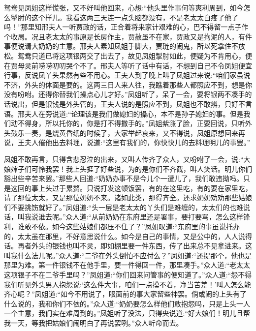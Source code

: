 \begin{parag}
    鸳鸯见凤姐这样慌张，又不好叫他回来，心想:“他头里作事何等爽利周到，如今怎么掣肘的这个样儿。我看这两三天连一点头脑都没有，不是老太太白疼了他了吗！”那里知邢夫人一听贾政的话，正合着将来家计艰难的心，巴不得留一点子作个收局。况且老太太的事原是长房作主，贾赦虽不在家，贾政又是拘泥的人，有件事便说请大奶奶的主意。邢夫人素知凤姐手脚大，贾琏的闹鬼，所以死拿住不放松。鸳鸯只道已将这项银两交了出去了，故见凤姐掣肘如此，便疑为不肯用心，便在贾母灵前唠唠叨叨哭个不了。邢夫人等听了话中有话，不想到自己不令凤姐便宜行事，反说凤丫头果然有些不用心。王夫人到了晚上叫了凤姐过来说:“咱们家虽说不济，外头的体面是要的。这两三日人来人往，我瞧着那些人都照应不到，想是你没有吩咐。还得你替我们操点心儿才好。”凤姐听了，呆了一会，要将银两不凑手的话说出，但是银钱是外头管的，王夫人说的是照应不到，凤姐也不敢辨，只好不言语。邢夫人在旁说道:“论理该是我们做媳妇的操心，本不是孙子媳妇的事。但是我们动不得身，所以托你的，你是打不得撒手的。”凤姐紫涨了脸，正要回说，只听外头鼓乐一奏，是烧黄昏纸的时候了，大家举起哀来，又不得说，凤姐原想回来再说，王夫人催他出去料理，说道:“这里有我们的，你快快儿的去料理明儿的事罢。”
\end{parag}


\begin{parag}
    凤姐不敢再言，只得含悲忍泣的出来，又叫人传齐了众人，又吩咐了一会，说:“大娘婶子们可怜我罢！我上头捱了好些说，为的是你们不齐截，叫人笑话。明儿你们豁出些辛苦来罢。”那些人回道:“奶奶办事不是今儿个一遭儿了，我们敢违拗吗。只是这回的事上头过于累赘。只说打发这顿饭罢，有的在这里吃，有的要在家里吃，请了那位太太，又是那位奶奶不来。诸如此类，那得齐全。还求奶奶劝劝那些姑娘们不要挑饬就好了。”凤姐道:“头一层是老太太的丫头们是难缠的，太太们的也难说话，叫我说谁去呢。”众人道:“从前奶奶在东府里还是署事，要打要骂，怎么这样锋利，谁敢不依。如今这些姑娘们都压不住了？”凤姐叹道:“东府里的事虽说托办的，太太虽在那里，不好意思说什么。如今是自己的事情，又是公中的，人人说得话。再者外头的银钱也叫不灵，即如棚里要一件东西，传了出来总不见拿进来。这叫我什么法儿呢。”众人道:“二爷在外头倒怕不应付么？”凤姐道:“还提那个，他也是那里为难。第一件银钱不在他手里，要一件得回一件，那里凑手。”众人道:“老太太这项银子不在二爷手里吗？”凤姐道:“你们回来问管事的便知道了。”众人道:“怨不得我们听见外头男人抱怨说:‘这么件大事，咱们一点摸不着，净当苦差！’叫人怎么能齐心呢？”凤姐道:“如今不用说了，眼面前的事大家留些神罢。倘或闹的上头有了什么说的，我和你们不依的。”众人道:“奶奶要怎么样他们敢抱怨吗，只是上头一人一个主意，我们实在难周到的。”凤姐听了没法，只得央说道:“好大娘们！明儿且帮我一天，等我把姑娘们闹明白了再说罢咧。”众人听命而去。
\end{parag}


